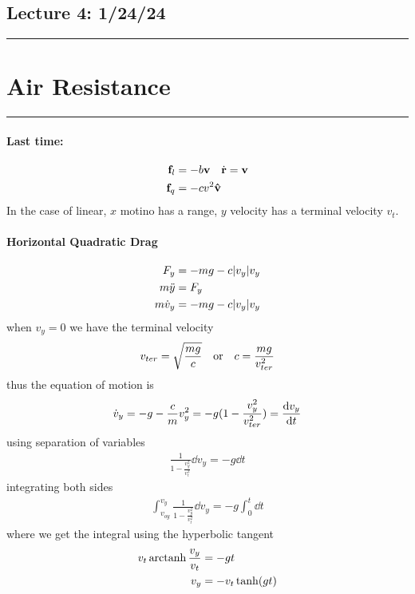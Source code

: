 \documentclass[../main.tex]{subfiles}
\begin{document}
\newpage
\subsection*{Lecture 4: \hfill  1/24/24}
\hrule \vspace{10px}
\section{Air Resistance}
\hrule \vspace{10px}

\paragraph{Last time:}
\begin{align*}
    \vb{f}_l &= -b \vb{v} \quad \dot{\vb{r}} = \vb{v} \\
    \vb{f}_q &= -cv^2 \vu{v}
\end{align*}
In the case of linear, $x$ motino has a range, $y$ velocity has a terminal velocity $v_t$.

\paragraph{Horizontal Quadratic Drag}
\begin{align*}
    F_y &= -mg - c\abs{v_y} v_y \\
    m\ddot y &= F_y \\
    m\dot v_y &= -mg - c\abs{v_y} v_y
\end{align*}
when $v_y = 0$ we have the terminal velocity
\begin{align*}
    v_{ter} = \sqrt{\frac{mg}{c}} \qor c = \frac{mg}{v_{ter}^2}
\end{align*}
thus the equation of motion is
\begin{align*}
    \dot v_y = -g - \frac{c}{m} v_y^2 = -g(1 - \frac{v_y^2}{v_{ter}^2}) = \dv{v_y}{t}
\end{align*}
using separation of variables
\begin{align*}
    \frac{1}{1 - \frac{v_y^2}{v_t^2}} \dd{v_y} = -g \dd{t}
\end{align*}
integrating both sides
\begin{align*}
    \int_{v_{oy}}^{v_y} \frac{1}{1 - \frac{v_y^2}{v_t^2}} \dd{v_y} = -g \int_0^t \dd{t}
\end{align*}
where we get the integral using the hyperbolic tangent
\begin{align*}
    v_t \operatorname{arctanh}{\frac{v_y}{v_t}} &= -gt \\
    v_y &= -v_t \tanh(gt)
\end{align*}
\end{document}
